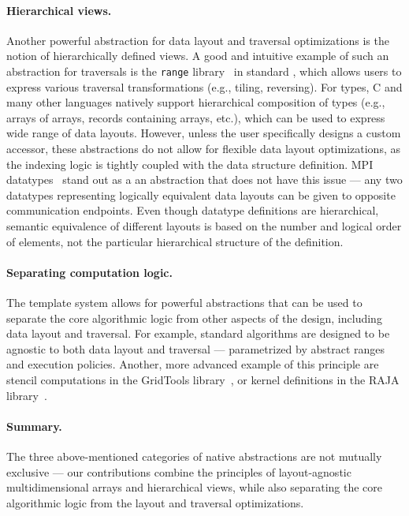 \paragraph{Hierarchical views.} Another powerful abstraction for data layout and traversal optimizations is the notion of hierarchically defined views. A good and intuitive example of such an abstraction for traversals is the \texttt{range} library~ in standard \cpp, which allows users to express various traversal transformations (e.g., tiling, reversing). For types, C and many other languages natively support hierarchical composition of types (e.g., arrays of arrays, records containing arrays, etc.), which can be used to express wide range of data layouts. However, unless the user specifically designs a custom accessor, these abstractions do not allow for flexible data layout optimizations, as the indexing logic is tightly coupled with the data structure definition. MPI datatypes~ stand out as a an abstraction that does not have this issue --- any two datatypes representing logically equivalent data layouts can be given to opposite communication endpoints. Even though datatype definitions are hierarchical, semantic equivalence of different layouts is based on the number and logical order of elements, not the particular hierarchical structure of the definition.

\paragraph{Separating computation logic.} The \cpp template system allows for powerful abstractions that can be used to separate the core algorithmic logic from other aspects of the design, including data layout and traversal. For example, standard \cpp algorithms  are designed to be agnostic to both data layout and traversal --- parametrized by abstract ranges and execution policies. Another, more advanced example of this principle are stencil computations in the GridTools library~\cite{afanasyev2021gridtools}, or kernel definitions in the RAJA library~\cite{beckingsale2019raja}.

\paragraph{Summary.}
The three above-mentioned categories of native abstractions are not mutually exclusive --- our contributions combine the principles of layout-agnostic multidimensional arrays and hierarchical views, while also separating the core algorithmic logic from the layout and traversal optimizations. 


